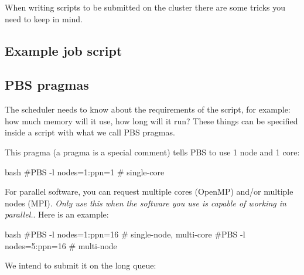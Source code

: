 When writing scripts to be submitted on the \gls{cluster} there are some tricks you need
to keep in mind.

\subsection{Example job script}


\subsection{PBS pragmas}

The scheduler needs to know about the requirements of the script, for example:
how much \gls{memory} will it use, how long will it run? These things can be specified
inside a script with what we call PBS pragmas.

This pragma (a pragma is a special comment) tells PBS to use 1 \gls{node} and 1 \gls{core}:

\begin{code}{bash}
  #PBS -l nodes=1:ppn=1   # single-core
\end{code}

For parallel software, you can request multiple cores (OpenMP) and/or multiple
nodes (\gls{MPI}). \emph{Only use this when the software you use is capable of working in
parallel.}. Here is an example:

\begin{code}{bash}
  #PBS -l nodes=1:ppn=16  # single-node, multi-core
  #PBS -l nodes=5:ppn=16  # multi-node
\end{code}

We intend to submit it on the long \gls{queue}:

